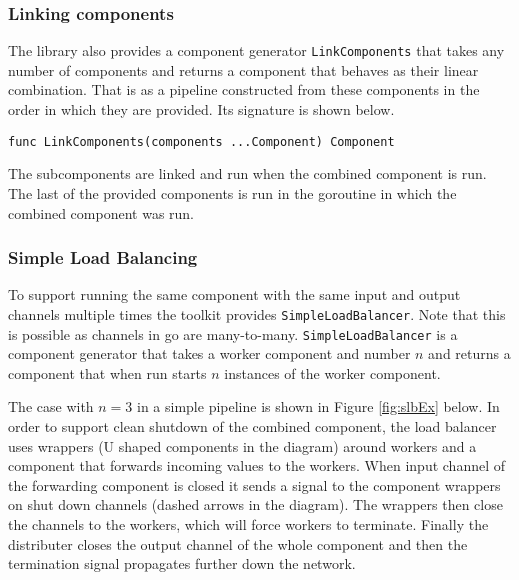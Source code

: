 \subsubsection{Linking components}
The library also provides a component generator \texttt{LinkComponents} that takes 
any number of components and returns a component that behaves as their 
linear combination. That is as a pipeline constructed from these components 
in the order in which they are provided. Its signature is shown below.
\begin{lstlisting}
func LinkComponents(components ...Component) Component
\end{lstlisting}
The subcomponents are linked and run when the combined component is run. 
The last of the provided components is run in the goroutine in which
the combined component was run.

\subsubsection{Simple Load Balancing}
To support running the same component with the same input and output 
channels multiple times the toolkit provides \texttt{SimpleLoadBalancer}.
Note that this is possible as channels in go are many-to-many.
\texttt{SimpleLoadBalancer} is a component generator that takes a worker 
component and number $n$ and returns a component that when run starts 
$n$ instances of the worker component. 

The case with $n=3$ in a simple pipeline is shown in Figure \ref{fig:slbEx} below. 
In order to support clean shutdown of the combined component, the load balancer uses 
wrappers (U shaped components in the diagram) around workers and a component that 
forwards incoming values to the workers. When input channel of the forwarding
component is closed it sends a signal to the component wrappers on shut 
down channels (dashed arrows in the diagram). The wrappers then close
the channels to the workers, which will force workers to terminate.
Finally the distributer closes the output channel of the whole component
and then the termination signal propagates further down the network.

